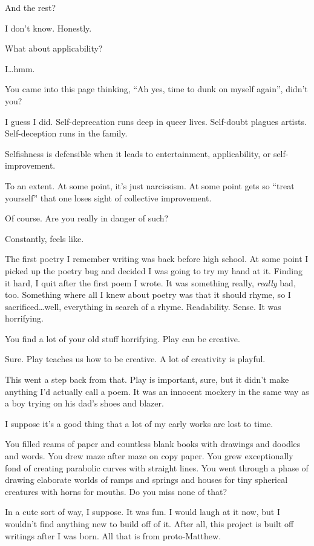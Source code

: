 \begin{paracol}{2}
\begin{leftcolumn}
\begin{ally}
And the rest?
\end{ally}
I don't know. Honestly.

\begin{ally}
What about applicability?
\end{ally}
I\ldots{}hmm.

\begin{ally}
You came into this page thinking, ``Ah yes, time to dunk on myself again'', didn't you?
\end{ally}
I guess I did. Self-deprecation runs deep in queer lives. Self-doubt plagues artists. Self-deception runs in the family.

\begin{ally}
Selfishness is defensible when it leads to entertainment, applicability, or self-improvement.
\end{ally}
To an extent. At some point, it's just narcissism. At some point gets so ``treat yourself'' that one loses sight of collective improvement.

\begin{ally}
Of course. Are you really in danger of such?
\end{ally}
Constantly, feels like.
\newpage

\noindent The first poetry I remember writing was back before high school. At some point I picked up the poetry bug and decided I was going to try my hand at it. Finding it hard, I quit after the first poem I wrote. It was something really, \emph{really} bad, too. Something where all I knew about poetry was that it should rhyme, so I sacrificed\ldots{}well, everything in search of a rhyme. Readability. Sense. It was horrifying.

\begin{ally}
You find a lot of your old stuff horrifying. Play can be creative.
\end{ally}
Sure. Play teaches us how to be creative. A lot of creativity is playful.

This went a step back from that. Play is important, sure, but it didn't make anything I'd actually call a poem. It was an innocent mockery in the same way as a boy trying on his dad's shoes and blazer.

I suppose it's a good thing that a lot of my early works are lost to time.

\begin{ally}
You filled reams of paper and countless blank books with drawings and doodles and words. You drew maze after maze on copy paper. You grew exceptionally fond of creating parabolic curves with straight lines. You went through a phase of drawing elaborate worlds of ramps and springs and houses for tiny spherical creatures with horns for mouths. Do you miss none of that?
\end{ally}
In a cute sort of way, I suppose. It was fun. I would laugh at it now, but I wouldn't find anything new to build off of it. After all, this project is built off writings after I was born. All that is from proto-Matthew.


\end{leftcolumn}
\end{paracol}
